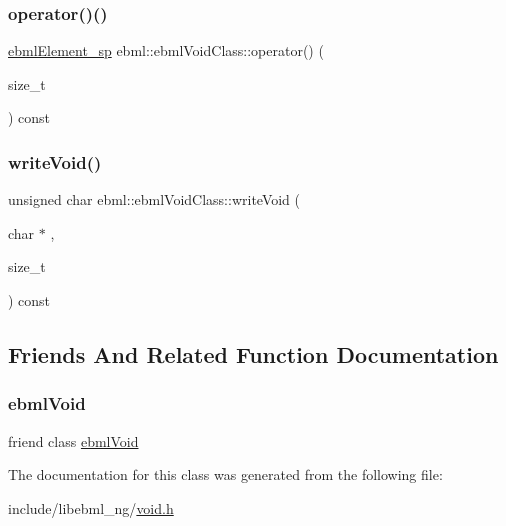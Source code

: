 \mbox{\label{classebml_1_1ebmlVoidClass_ad570c8614bf8fc88edecbbe0d3a335e6}} 
\subsubsection{\texorpdfstring{operator()()}{operator()()}}
{\footnotesize\ttfamily \mbox{\hyperlink{namespaceebml_adad533b7705a16bb360fe56380c5e7be}{ebml\+Element\+\_\+sp}} ebml\+::ebml\+Void\+Class\+::operator() (\begin{DoxyParamCaption}\item[{size\+\_\+t}]{ }\end{DoxyParamCaption}) const}

\mbox{\label{classebml_1_1ebmlVoidClass_af6a9a389aa1e83b0559a90740808b707}} 
\subsubsection{\texorpdfstring{write\+Void()}{writeVoid()}}
{\footnotesize\ttfamily unsigned char ebml\+::ebml\+Void\+Class\+::write\+Void (\begin{DoxyParamCaption}\item[{char $\ast$}]{,  }\item[{size\+\_\+t}]{ }\end{DoxyParamCaption}) const}



\subsection{Friends And Related Function Documentation}
\mbox{\label{classebml_1_1ebmlVoidClass_af2d556fe3de73937062cdd59bad2a1c0}} 
\subsubsection{\texorpdfstring{ebml\+Void}{ebmlVoid}}
{\footnotesize\ttfamily friend class \mbox{\hyperlink{classebml_1_1ebmlVoid}{ebml\+Void}}\hspace{0.3cm}{\ttfamily [friend]}}



The documentation for this class was generated from the following file\+:\begin{DoxyCompactItemize}
\item 
include/libebml\+\_\+ng/\mbox{\hyperlink{void_8h}{void.\+h}}\end{DoxyCompactItemize}
